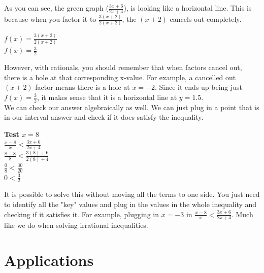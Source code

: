 \documentclass[12pt,fleqn]{book} %
\begin{document}
\noindent As you can see, the green graph ($\frac{3x+6}{2x+4}$), is looking like a horizontal line. This is because when you factor it to $\frac{3(x+2)}{2(x+2)}$, the $(x+2)$ cancels out completely. \\

\vspace*{-6mm}

\begin{center}
    \LARGE{$f(x)=\frac{3(x+2)}{2(x+2)}$}\\
    \LARGE{$f(x)=\frac{3}{2}$}\\
\end{center}

\noindent However, with rationals, you should remember that when factors cancel out, there is a hole at that corresponding x-value. For example, a cancelled out $(x+2)$ factor means there is a hole at $x=-2$. Since it ends up being just $f(x)=\frac{3}{2}$, it makes sense that it is a horizontal line at $y=1.5$.\\

\noindent We can check our answer algebraically as well. We can just plug in a point that is in our interval answer and check if it does satisfy the inequality. 

\begin{center}
    \textbf{Test $x=8$}\\
    \large{$\frac{x-8}{x} < \frac{3x+6}{2x+4}$}\\
    \vspace{2mm}
    \large{$\frac{8-8}{8} < \frac{3(8)+6}{2(8)+4}$}\\
    \vspace{2mm}
    \large{$\frac{0}{8} < \frac{30}{20}$}\\
    \vspace{1mm}
    \large{$0 < \frac{3}{2}$}\\
\end{center}

\noindent It is possible to solve this without moving all the terms to one side. You just need to identify all the "key" values and plug in the values in the whole inequality and checking if it satisfies it. For example, plugging in $x=-3$ in $\frac{x-8}{x} < \frac{3x+6}{2x+4}$. Much like we do when solving irrational inequalities.


\section{Applications}
\end{document}
